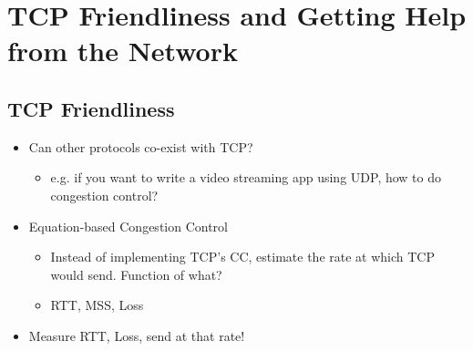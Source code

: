 \section{TCP Friendliness and Getting Help from the Network}
\subsection{TCP Friendliness}
\begin{itemize}[nosep]
    \item Can other protocols co-exist with TCP?
          \begin{itemize}[nosep]
              \item e.g. if you want to write a video streaming app using UDP, how to do congestion control?
          \end{itemize}
    \item Equation-based Congestion Control
          \begin{itemize}[nosep]
              \item Instead of implementing TCP's CC, estimate the rate at which TCP would send. Function of what?
              \item RTT, MSS, Loss
          \end{itemize}
    \item Measure RTT, Loss, send at that rate!
\end{itemize}

